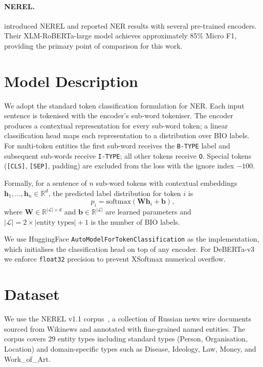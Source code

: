 \documentclass{article}
\begin{document}
\paragraph{NEREL.}
\citet{loukachevitch2021nerel} introduced NEREL and reported NER results with
several pre-trained encoders.
Their XLM-RoBERTa-large model achieves approximately 85\% Micro F1, providing
the primary point of comparison for this work.

\section{Model Description}

We adopt the standard token classification formulation for NER.
Each input sentence is tokenised with the encoder's sub-word tokeniser.
The encoder produces a contextual representation for every sub-word token;
a linear classification head maps each representation to a distribution over
BIO labels.
For multi-token entities the first sub-word receives the \texttt{B-TYPE} label
and subsequent sub-words receive \texttt{I-TYPE}; all other tokens receive
\texttt{O}.
Special tokens (\texttt{[CLS]}, \texttt{[SEP]}, padding) are excluded from
the loss with the ignore index $-100$.

Formally, for a sentence of $n$ sub-word tokens with contextual embeddings
$\mathbf{h}_1, \ldots, \mathbf{h}_n \in \mathbb{R}^d$, the predicted label
distribution for token $i$ is
\[
  p_i = \mathrm{softmax}(\mathbf{W}\mathbf{h}_i + \mathbf{b}),
\]
where $\mathbf{W} \in \mathbb{R}^{|\mathcal{L}| \times d}$ and
$\mathbf{b} \in \mathbb{R}^{|\mathcal{L}|}$ are learned parameters and
$|\mathcal{L}| = 2 \times |\text{entity types}| + 1$ is the number of BIO labels.

We use HuggingFace \texttt{AutoModelForTokenClassification} as the
implementation, which initialises the classification head on top of any
encoder.
For DeBERTa-v3 we enforce \texttt{float32} precision to prevent XSoftmax
numerical overflow.

\section{Dataset}

We use the NEREL v1.1 corpus~\cite{loukachevitch2021nerel}, a collection of
Russian news wire documents sourced from Wikinews and annotated with fine-grained
named entities.
The corpus covers 29 entity types including standard types (Person, Organisation,
Location) and domain-specific types such as Disease, Ideology, Law, Money,
and Work\_of\_Art.
\end{document}
